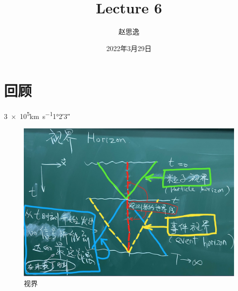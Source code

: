 \documentclass[12pt]{ctexart}
\title{Lecture 6}
\author{赵思逸}
\date{2022年3月29日}
\begin{document}
\maketitle


\section{回顾}

\num[]{3e5}\si[]{km.s^{-1}}\ang{1;2;3}


\begin{figure}[!hbtp]
	\centering
	\includegraphics[width=1.0\linewidth]{horizon.jpg}
	\caption{视界}
\end{figure}
\end{document}
